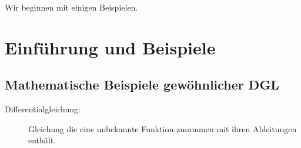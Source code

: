 \documentclass[12pt,a4paper]{book}
\theoremstyle{break}
\theoremstyle{nonumberplain}
\newcommand{\1}{\mathbbm{1}} 			      	%
\begin{document}
Wir beginnen mit einigen Beispielen.

\section{Einführung und Beispiele}\label{sect:ODE_intro}

\subsection{Mathematische Beispiele gewöhnlicher DGL}

\begin{description}
\item[Differentialgleichung:] Gleichung die eine unbekannte Funktion zusammen mit ihren Ableitungen enthält.
\end{description}
\end{document}
